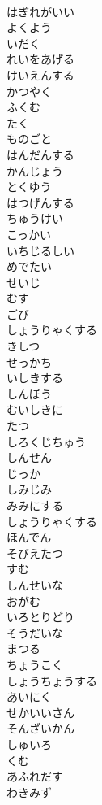 \documentclass[8pt]{extreport}
\begin{document}
\begin{CJK}{UTF8}{min}
\\	はぎれがいい
\\	よくよう
\\	いだく
\\	れいをあげる
\\	けいえんする
\\	かつやく
\\	ふくむ
\\	たく
\\	ものごと
\\	はんだんする
\\	かんじょう
\\	とくゆう
\\	はつげんする
\\	ちゅうけい
\\	こっかい
\\	いちじるしい
\\	めでたい
\\	せいじ
\\	むす
\\	ごび
\\	しょうりゃくする
\\	きしつ
\\	せっかち
\\	いしきする
\\	しんぼう
\\	むいしきに
\\	たつ
\\	しろくじちゅう
\\	しんせん
\\	じっか
\\	しみじみ
\\	みみにする
\\	しょうりゃくする
\\	ほんでん
\\	そびえたつ
\\	すむ
\\	しんせいな
\\	おがむ
\\	いろとりどり
\\	そうだいな
\\	まつる
\\	ちょうこく
\\	しょうちょうする
\\	あいにく
\\	せかいいさん
\\	そんざいかん
\\	しゅいろ
\\	くむ
\\	あふれだす
\\	わきみず

\end{CJK}
\end{document}

